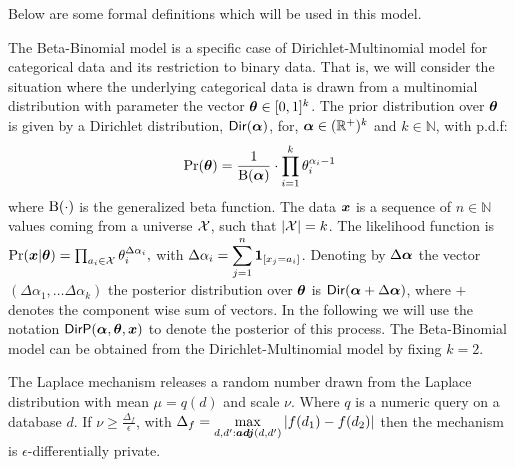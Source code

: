 \documentclass{article}
\begin{document}
%
Below are some formal definitions which will be used in this model.

\begin{defn}
The Beta-Binomial model is a specific case of Dirichlet-Multinomial model for
categorical data and its restriction to binary data.
That is, we will consider the situation where 
the underlying categorical data is drawn from a multinomial
distribution with parameter the vector $\boldsymbol{\theta}\in [0,1]^{k}$. The prior distribution over $\boldsymbol{\theta}$
is given by a Dirichlet distribution, $\mathsf{Dir}(\boldsymbol{\alpha})$, for,
$\boldsymbol{\alpha}\in(\mathbb{R}^{+})^{k}$ and $k\in\mathbb{N}$, with p.d.f:
\[
\Pr(\boldsymbol{\theta})=\frac{1}{\boldsymbol{\textup{B}}(\boldsymbol{\alpha})}\cdot\prod_{i=1}^{k}{\theta_i^{\alpha_i-1}}
\]
where $\boldsymbol{\textup{B}}(\cdot)$ is the generalized beta function.
The data $\boldsymbol{x}$ is a sequence of $n\in\mathbb{N}$ values
coming from a universe $\mathcal{X}$, such that $|\mathcal{X}|=k$.
The likelihood function is
$
\Pr(\boldsymbol{x}|\boldsymbol{\theta})=\prod_{a_i\in\mathcal{X}}\theta_{i}^{\Delta \alpha_i},
$
with $\Delta \alpha_i=\displaystyle\sum_{j=1}^{n}\mathbf{1}_{[x_j=a_i]}$.
Denoting by $\Delta\boldsymbol{\alpha}$ the vector $(\Delta\alpha_1,\dots
\Delta\alpha_k)$ the posterior distribution over $\boldsymbol{\theta}$ is
$\mathsf{Dir}(\boldsymbol{\alpha} + \Delta \boldsymbol{\alpha})$, where $+$ denotes the component wise sum of vectors.
In the following we will use the notation $\mathsf{DirP}(\boldsymbol{\alpha},\boldsymbol{\theta},
\boldsymbol{x})$ to denote the posterior of this process.
The Beta-Binomial model can be obtained from the Dirichlet-Multinomial
model by fixing $k=2$. 
\end{defn}


\begin{defn}
The Laplace mechanism releases a random number drawn from the Laplace distribution with
mean $\mu=q(d)$ and scale $\nu$. Where $q$ is a numeric query on a database $d$.
If $\nu\geq \frac{\Delta_f}{\epsilon}$, with $\Delta_f=\displaystyle\max_{d,d':\boldsymbol{adj}(d,d')}{\lvert f(d_1)-f(d_2)\lvert}$
then the mechanism is $\epsilon$-differentially private.
\end{defn}
\end{document}
